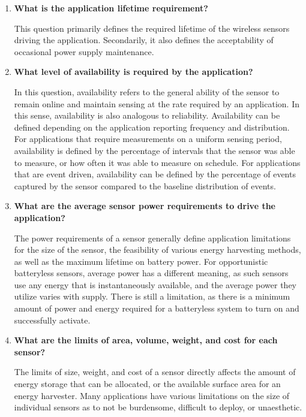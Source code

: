 \begin{enumerate}
    \item \textbf{What is the application lifetime requirement?}

    This question primarily defines the required lifetime of the wireless sensors driving the application. Secondarily, it also defines the acceptability of occasional power supply maintenance.

    \item \textbf{What level of availability is required by the application?}

    In this question, availability refers to the general ability of the sensor to remain online and maintain sensing at the rate required by an application. In this sense, availability is also analogous to reliability.
    Availability can be defined depending on the application reporting frequency and distribution. For applications that require measurements on a uniform sensing period, availability is defined by the percentage of intervals that the sensor was able to measure, or how often it was able to measure on schedule. For applications that are event driven, availability can be defined by the percentage of events captured by the sensor compared to the baseline distribution of events.

    \item \textbf{What are the average sensor power requirements to drive the application?}

    The power requirements of a sensor generally define application limitations for the size of the sensor, the feasibility of various energy harvesting methods, as well as the maximum lifetime on battery power.
    For opportunistic batteryless sensors, average power has a different meaning, as such sensors use any energy that is instantaneously available, and the average power they utilize varies with supply.
    There is still a limitation, as there is a minimum amount of power and energy required for a batteryless system to turn on and successfully activate.

    \item \textbf{What are the limits of area, volume, weight, and cost for each sensor?}

    The limits of size, weight, and cost of a sensor directly affects the amount of energy storage that can be allocated, or the available surface area for an energy harvester. Many applications have various limitations on the size of individual sensors as to not be burdensome, difficult to deploy, or unaesthetic.
    
%
%
\end{enumerate}


